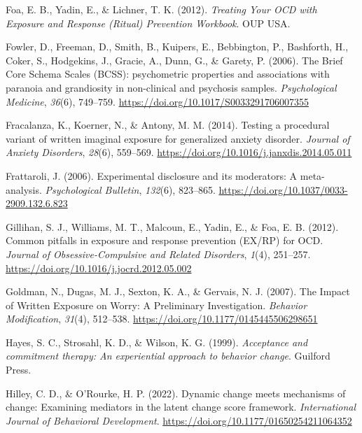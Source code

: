 \documentclass[
  man,floatsintext]{apa7}
\newlength{\cslhangindent}
\newlength{\cslentryspacingunit} %
\newenvironment{CSLReferences}[2] %
 {%
  \setlength{\parindent}{0pt}
  \ifodd #1
  \let\oldpar\par
  \def\par{\hangindent=\cslhangindent\oldpar}
  \fi
  \setlength{\parskip}{#2\cslentryspacingunit}
 }%
 {}
\begin{document}
\begin{CSLReferences}{1}{0}
\leavevmode{}%
Foa, E. B., Yadin, E., \& Lichner, T. K. (2012). \emph{Treating Your OCD with Exposure and Response (Ritual) Prevention Workbook}. OUP USA.

\leavevmode{}%
Fowler, D., Freeman, D., Smith, B., Kuipers, E., Bebbington, P., Bashforth, H., Coker, S., Hodgekins, J., Gracie, A., Dunn, G., \& Garety, P. (2006). The Brief Core Schema Scales (BCSS): psychometric properties and associations with paranoia and grandiosity in non-clinical and psychosis samples. \emph{Psychological Medicine}, \emph{36}(6), 749--759. \url{https://doi.org/10.1017/S0033291706007355}

\leavevmode{}%
Fracalanza, K., Koerner, N., \& Antony, M. M. (2014). Testing a procedural variant of written imaginal exposure for generalized anxiety disorder. \emph{Journal of Anxiety Disorders}, \emph{28}(6), 559--569. \url{https://doi.org/10.1016/j.janxdis.2014.05.011}

\leavevmode{}%
Frattaroli, J. (2006). Experimental disclosure and its moderators: A meta-analysis. \emph{Psychological Bulletin}, \emph{132}(6), 823--865. \url{https://doi.org/10.1037/0033-2909.132.6.823}

\leavevmode{}%
Gillihan, S. J., Williams, M. T., Malcoun, E., Yadin, E., \& Foa, E. B. (2012). Common pitfalls in exposure and response prevention (EX/RP) for OCD. \emph{Journal of Obsessive-Compulsive and Related Disorders}, \emph{1}(4), 251--257. \url{https://doi.org/10.1016/j.jocrd.2012.05.002}

\leavevmode{}%
Goldman, N., Dugas, M. J., Sexton, K. A., \& Gervais, N. J. (2007). The Impact of Written Exposure on Worry: A Preliminary Investigation. \emph{Behavior Modification}, \emph{31}(4), 512--538. \url{https://doi.org/10.1177/0145445506298651}

\leavevmode{}%
Hayes, S. C., Strosahl, K. D., \& Wilson, K. G. (1999). \emph{Acceptance and commitment therapy: An experiential approach to behavior change}. Guilford Press.

\leavevmode{}%
Hilley, C. D., \& O'Rourke, H. P. (2022). Dynamic change meets mechanisms of change: Examining mediators in the latent change score framework. \emph{International Journal of Behavioral Development}. \url{https://doi.org/10.1177/01650254211064352}


\end{CSLReferences}
\end{document}
